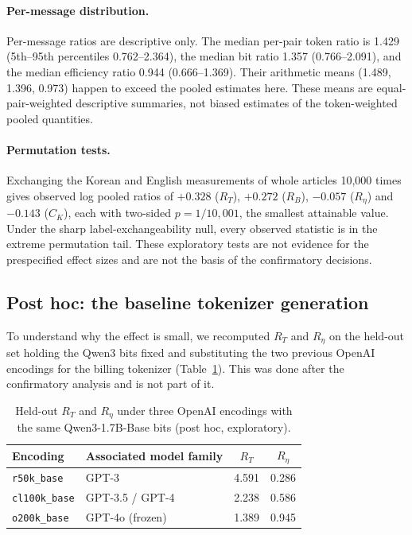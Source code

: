 \documentclass[11pt,a4paper]{article}
\newcommand{\RT}{R_{T}}
\newcommand{\RB}{R_{B}}
\newcommand{\Reta}{R_{\eta}}
\newcommand{\CK}{C_{K}}
\begin{document}
\paragraph{Per-message distribution.} Per-message ratios are descriptive
only. The median per-pair token ratio is 1.429 (5th--95th percentiles
0.762--2.364), the median bit ratio 1.357 (0.766--2.091), and the median
efficiency ratio 0.944 (0.666--1.369). Their arithmetic means (1.489, 1.396,
0.973) happen to exceed the pooled estimates here. These means are
equal-pair-weighted descriptive summaries, not biased estimates of the
token-weighted pooled quantities.

\paragraph{Permutation tests.} Exchanging the Korean and English
measurements of whole articles 10{,}000 times gives observed log pooled
ratios of $+0.328$ ($\RT$), $+0.272$ ($\RB$), $-0.057$ ($\Reta$) and
$-0.143$ ($\CK$), each with two-sided $p=1/10{,}001$, the smallest
attainable value. Under the sharp label-exchangeability null, every observed
statistic is in the extreme permutation tail. These exploratory tests are not
evidence for the prespecified effect sizes and are not the basis of the
confirmatory decisions.

\subsection{Post hoc: the baseline tokenizer generation}
\label{sec:generation}

To understand why the effect is small, we recomputed $\RT$ and $\Reta$ on
the held-out set holding the Qwen3 bits fixed and substituting the two
previous OpenAI encodings for the billing tokenizer (Table~\ref{tab:gen}).
This was done after the confirmatory analysis and is not part of it.

\begin{table}[htbp]
\centering\small
\caption{Held-out $\RT$ and $\Reta$ under three OpenAI encodings with the
same Qwen3-1.7B-Base bits (post hoc, exploratory).}
\label{tab:gen}
\begin{tabular}{@{}llcc@{}}
\toprule
Encoding & Associated model family & $\RT$ & $\Reta$ \\
\midrule
\texttt{r50k\_base}   & GPT-3            & 4.591 & 0.286 \\
\texttt{cl100k\_base} & GPT-3.5 / GPT-4  & 2.238 & 0.586 \\
\texttt{o200k\_base}  & GPT-4o (frozen)  & 1.389 & 0.945 \\
\bottomrule
\end{tabular}
\end{table}
\end{document}
